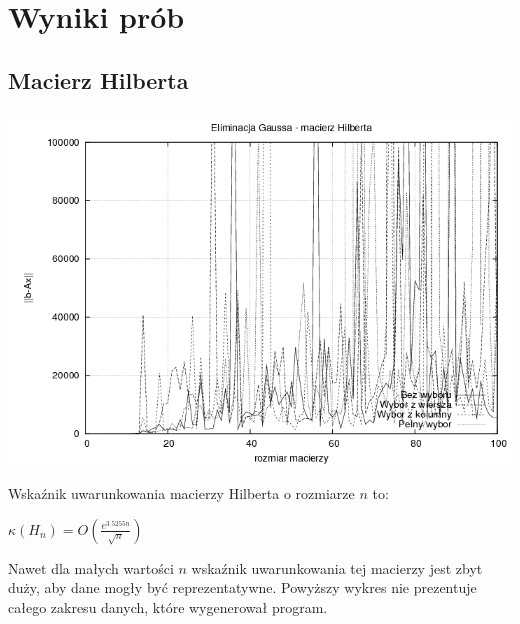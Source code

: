\documentclass[a4paper,10pt]{article}
\begin{document}
\section{Wyniki prób}
    \subsection{Macierz Hilberta}
        \begin{center}
            \includegraphics[width=140mm]{hilbert_plot.png}
        \end{center}
        Wskaźnik uwarunkowania macierzy Hilberta o rozmiarze $n$ to\cite{Wi}:
        \begin{center}
            $ \kappa(H_{n}) = O(\frac{e^{3.5255n}}{\sqrt{n}})$
        \end{center}
            Nawet dla małych wartości $n$ wskaźnik uwarunkowania tej macierzy jest zbyt duży, aby dane mogły być reprezentatywne. Powyższy wykres nie prezentuje całego zakresu danych, które wygenerował program.
\end{document}
